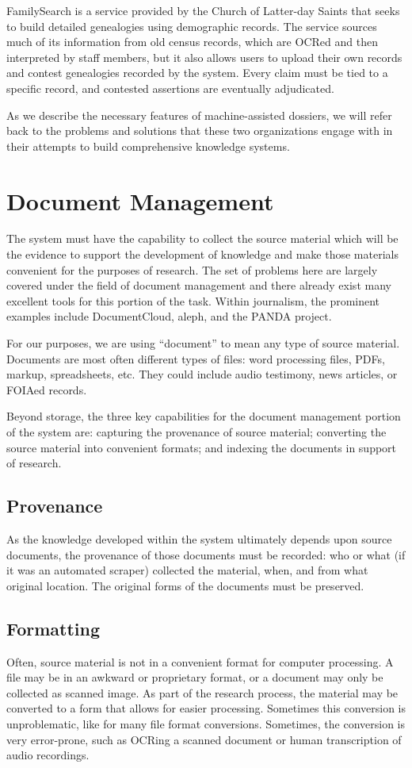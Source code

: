 \documentclass[format=siggraph, review=true]{acmart}
\begin{document}
FamilySearch is a service provided by the Church of Latter-day Saints
that seeks to build detailed genealogies using demographic records.
The service sources much of its information from old census records,
which are OCRed and then interpreted by staff members, but it also allows
users to upload their own records and contest genealogies recorded by the
system. Every claim must be tied to a specific record, and contested
assertions are eventually adjudicated.

As we describe the necessary features of machine-assisted dossiers, we will
refer back to the problems and solutions that these two organizations
engage with in their attempts to build comprehensive knowledge systems.

\section{Document Management}
The system must have the capability to collect the source material
which will be the evidence to support the development of
knowledge and make those materials convenient for the purposes of
research. The set of problems here are largely covered under the field
of document management and there already exist many excellent tools
for this portion of the task. Within journalism, the prominent
examples include DocumentCloud, aleph, and the PANDA project.

For our purposes, we are using ``document'' to mean any type of source
material. Documents are most often different types of files: word
processing files, PDFs, markup, spreadsheets, etc. They could
include audio testimony, news articles, or FOIAed records.

Beyond storage, the three key capabilities for the document management
portion of the system are: capturing the provenance of source material;
converting the source material into convenient formats; and indexing
the documents in support of research.

\subsection{Provenance}
As the knowledge developed within the system ultimately depends upon
source documents, the provenance of those documents must be
recorded: who or what (if it was an automated scraper) collected the
material, when, and from what original location. The original forms of the
documents must be preserved.

\subsection{Formatting}
Often, source material is not in a convenient format for computer
processing. A file may be in an awkward or proprietary format, or a
document may only be collected as scanned image. As part of the
research process, the material may be converted to a form that allows
for easier processing. Sometimes this conversion is unproblematic,
like for many file format conversions. Sometimes, the conversion is
very error-prone, such as OCRing a scanned document or human
transcription of audio recordings.
\end{document}
